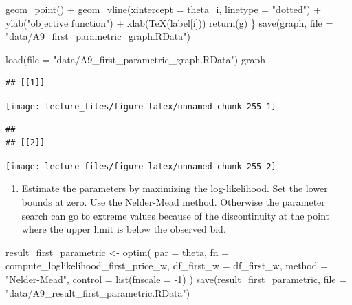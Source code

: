 \documentclass[
]{book}
\newenvironment{Shaded}{\begin{snugshade}}{\end{snugshade}}
\newcommand{\AttributeTok}[1]{\textcolor[rgb]{0.77,0.63,0.00}{#1}}
\newcommand{\DecValTok}[1]{\textcolor[rgb]{0.00,0.00,0.81}{#1}}
\newcommand{\FunctionTok}[1]{\textcolor[rgb]{0.00,0.00,0.00}{#1}}
\newcommand{\NormalTok}[1]{#1}
\newcommand{\OtherTok}[1]{\textcolor[rgb]{0.56,0.35,0.01}{#1}}
\newcommand{\SpecialCharTok}[1]{\textcolor[rgb]{0.00,0.00,0.00}{#1}}
\newcommand{\StringTok}[1]{\textcolor[rgb]{0.31,0.60,0.02}{#1}}
\providecommand{\tightlist}{%
  \setlength{\itemsep}{0pt}\setlength{\parskip}{0pt}}
\begin{document}
\begin{Shaded}
\begin{Highlighting}[]
    \FunctionTok{geom\_point}\NormalTok{() }\SpecialCharTok{+}
    \FunctionTok{geom\_vline}\NormalTok{(}\AttributeTok{xintercept =}\NormalTok{ theta\_i, }\AttributeTok{linetype =} \StringTok{"dotted"}\NormalTok{) }\SpecialCharTok{+}
    \FunctionTok{ylab}\NormalTok{(}\StringTok{"objective function"}\NormalTok{) }\SpecialCharTok{+} \FunctionTok{xlab}\NormalTok{(}\FunctionTok{TeX}\NormalTok{(label[i]))}
  \FunctionTok{return}\NormalTok{(g)}
\NormalTok{\}}
\FunctionTok{save}\NormalTok{(graph, }\AttributeTok{file =} \StringTok{"data/A9\_first\_parametric\_graph.RData"}\NormalTok{)}
\end{Highlighting}
\end{Shaded}

\begin{Shaded}
\begin{Highlighting}[]
\FunctionTok{load}\NormalTok{(}\AttributeTok{file =} \StringTok{"data/A9\_first\_parametric\_graph.RData"}\NormalTok{)}
\NormalTok{graph}
\end{Highlighting}
\end{Shaded}

\begin{verbatim}
## [[1]]
\end{verbatim}

\begin{center}\texttt{[image: lecture\_files/figure-latex/unnamed-chunk-255-1]} \end{center}

\begin{verbatim}
## 
## [[2]]
\end{verbatim}

\begin{center}\texttt{[image: lecture\_files/figure-latex/unnamed-chunk-255-2]} \end{center}

\begin{enumerate}
\def\labelenumi{\arabic{enumi}.}
\setcounter{enumi}{8}
\tightlist
\item
  Estimate the parameters by maximizing the log-likelihood. Set the lower bounds at zero. Use the Nelder-Mead method. Otherwise the parameter search can go to extreme values because of the discontinuity at the point where the upper limit is below the observed bid.
\end{enumerate}

\begin{Shaded}
\begin{Highlighting}[]
\NormalTok{result\_first\_parametric }\OtherTok{\textless{}{-}}
  \FunctionTok{optim}\NormalTok{(}
    \AttributeTok{par =}\NormalTok{ theta,}
    \AttributeTok{fn =}\NormalTok{ compute\_loglikelihood\_first\_price\_w,}
    \AttributeTok{df\_first\_w =}\NormalTok{ df\_first\_w,}
    \AttributeTok{method =} \StringTok{"Nelder{-}Mead"}\NormalTok{,}
    \AttributeTok{control =} \FunctionTok{list}\NormalTok{(}\AttributeTok{fnscale =} \SpecialCharTok{{-}}\DecValTok{1}\NormalTok{)}
\NormalTok{  )}
\FunctionTok{save}\NormalTok{(result\_first\_parametric, }\AttributeTok{file =} \StringTok{"data/A9\_result\_first\_parametric.RData"}\NormalTok{)}
\end{Highlighting}
\end{Shaded}
\end{document}
